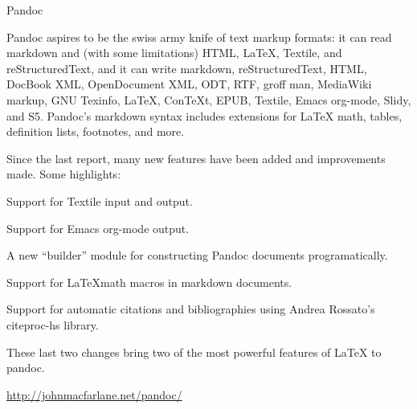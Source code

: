 \begin{hcarentry}{Pandoc}
\label{pandoc}
\makeheader

Pandoc aspires to be the swiss army knife of text markup formats: it
can read markdown and (with some limitations) HTML, LaTeX, Textile, and
reStructuredText, and it can write markdown, reStructuredText, HTML,
DocBook XML, OpenDocument XML, ODT, RTF, groff man, MediaWiki markup,
GNU Texinfo, LaTeX, ConTeXt, EPUB, Textile, Emacs org-mode,
Slidy, and S5. Pandoc's markdown syntax includes extensions for LaTeX math,
tables, definition lists, footnotes, and more.

Since the last report, many new features have been added and improvements
made.  Some highlights:
\begin{compactitem}
\item Support for Textile input and output.
\item Support for Emacs org-mode output.
\item A new ``builder'' module for constructing Pandoc documents programatically.
\item Support for \LaTeX math macros in markdown documents.
\item Support for automatic citations and bibliographies using Andrea
Rossato's citeproc-hs library.
\end{compactitem}

These last two changes bring two of the most powerful features of \LaTeX
to pandoc.

\FurtherReading
    \url{http://johnmacfarlane.net/pandoc/}
\end{hcarentry}
